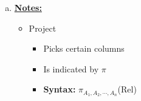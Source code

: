 \documentclass[12pt]{article}
\begin{document}
\begin{enumerate}
\begin{enumerate}[a)]
        \item

        \bigskip

        \underline{\textbf{Notes:}}

        \bigskip

        \begin{itemize}
            \item Project
            \begin{itemize}
                \item Picks certain columns
                \item Is indicated by $\pi$
                \item \textbf{Syntax:} $\pi_{A_1, A_2, \cdots, A_n}$(Rel)
            \end{itemize}
        \end{itemize}


    \end{enumerate}
\end{enumerate}
\end{document}
